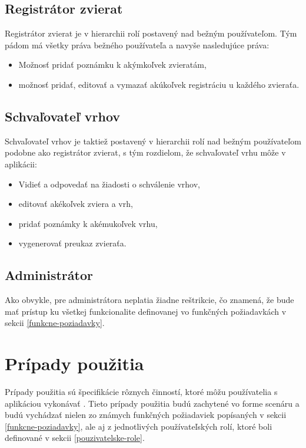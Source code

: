 \subsection{Registrátor zvierat}\label{registrator-zvierat}
Registrátor zvierat je v hierarchii rolí postavený nad bežným používateľom. Tým pádom má všetky práva bežného používateľa a navyše nasledujúce práva:

\begin{itemize}
	\item Možnosť pridať poznámku k akýmkoľvek zvieratám,
	\item možnosť pridať, editovať a vymazať akúkoľvek registráciu u každého zvieraťa.
\end{itemize} 

\subsection{Schvaľovateľ vrhov}\label{schvaľovateľ-vrhov}
Schvaľovateľ vrhov je taktiež postavený v hierarchii rolí nad bežným používateľom podobne ako registrátor zvierat, s tým rozdielom, že schvaľovateľ vrhu môže v aplikácii:

\begin{itemize}
	\item Vidieť a odpovedať na žiadosti o schválenie vrhov,
	\item editovať akékoľvek zviera a vrh,
	\item pridať poznámky k akémukoľvek vrhu,
	\item vygenerovať preukaz zvieraťa.
\end{itemize}

\subsection{Administrátor}\label{administrator}
Ako obvykle, pre administrátora neplatia žiadne reštrikcie, čo znamená, že bude mať prístup ku všetkej funkcionalite definovanej vo funkčných požiadavkách v sekcii \ref{funkcne-poziadavky}.

\section{Prípady použitia}\label{pripady-pouzitia}
Prípady použitia sú špecifikácie rôznych činností, ktoré môžu používatelia s aplikáciou vykonávať \cite{co-su-pripady-pouzitia}. Tieto prípady použitia budú zachytené vo forme scenáru a budú vychádzať nielen zo známych funkčných požiadaviek popísaných v sekcii \ref{funkcne-poziadavky}, ale aj z jednotlivých používateľských rolí, ktoré boli definované v sekcii \ref{pouzivatelske-role}.

